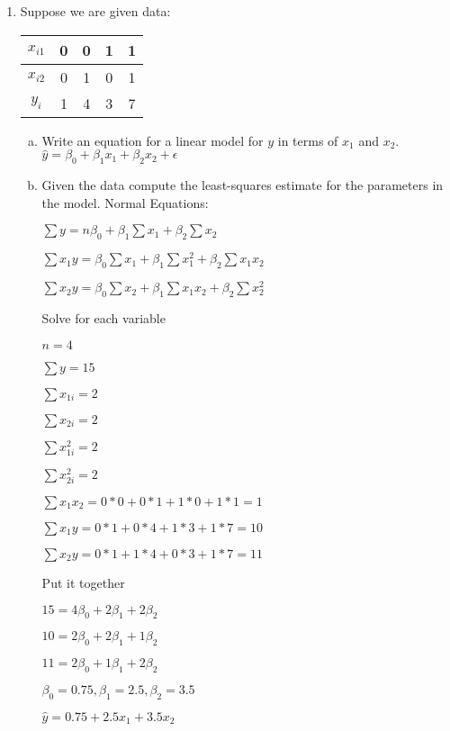 \documentclass[11pt]{article}
\begin{document}
\begin{enumerate}
\item Suppose we are given data:
\begin{center}
\begin{tabular}[h]{|c|c|c|c|c|} \hline
$x_{i1}$ & 0 & 0 & 1 & 1 \\ \hline
$x_{i2}$ & 0 & 1 & 0 & 1 \\ \hline
$y_i$ &    1 & 4 & 3 & 7  \\ \hline
\end{tabular}
\begin{enumerate}[(a)]
\item Write an equation for a linear model for $y$ in terms of $x_1$ and $x_2$.
\(\hat{y}=\beta_0+\beta_1x_1+\beta_2x_2 + \epsilon\)
\item Given the data compute the least-squares estimate for the parameters
in the model.
Normal Equations:\par
\(\sum{y}=n\beta_0+\beta_1\sum{x_1}+\beta_2\sum{x_2}\)\par
\(\sum{x_1y}=\beta_0\sum{x_1}+\beta_1\sum{x_1^2}+\beta_2\sum{x_1x_2}\)\par
\(\sum{x_2y}=\beta_0\sum{x_2}+\beta_1\sum{x_1x_2}+\beta_2\sum{x_2^2}\)\par
Solve for each variable\par
\(n=4\)\par
\(\sum{y} = 15\)\par
\(\sum{x_{1i}} = 2\)\par
\(\sum{x_{2i}} = 2\)\par
\(\sum{x_{1i}^2} = 2\)\par
\(\sum{x_{2i}^2} = 2\)\par
\(\sum{x_1x_2} = 0*0+0*1+1*0+1*1=1\)\par
\(\sum{x_1y} = 0*1+0*4+1*3+1*7=10\)\par
\(\sum{x_2y} = 0*1+1*4+0*3+1*7=11\)\par
Put it together\par
\(15=4\beta_0+2\beta_1+2\beta_2\)\par
\(10=2\beta_0+2\beta_1+1\beta_2\)\par
\(11=2\beta_0+1\beta_1+2\beta_2\)\par
\(\beta_0=0.75, \beta_1=2.5, \beta_2=3.5\)\par
\(\hat{y}=0.75+2.5x_1+3.5x_2\)

\end{enumerate}
\end{center}


\end{enumerate}
\end{document}
